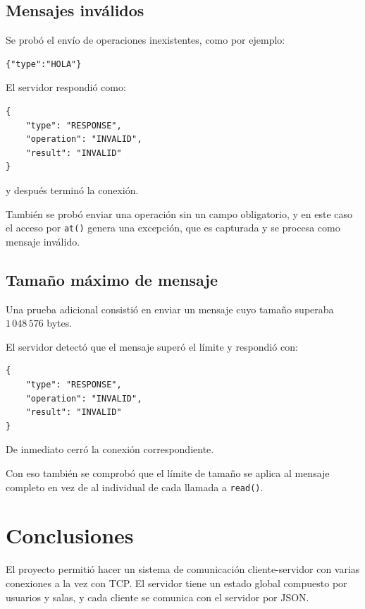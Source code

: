 \documentclass[12pt,letterpaper]{article}
\begin{document}
\subsection{Mensajes inválidos}

Se probó el envío de operaciones inexistentes, como por ejemplo:

\begin{lstlisting}[style=jsonstyle]
{"type":"HOLA"}
\end{lstlisting}

El servidor respondió como:

\begin{lstlisting}[style=jsonstyle]
{
    "type": "RESPONSE",
    "operation": "INVALID",
    "result": "INVALID"
}
\end{lstlisting}

y después terminó la conexión.

También se probó enviar una operación sin un campo obligatorio, y en este caso el acceso por \texttt{at()} genera una excepción, que es capturada y se procesa como mensaje inválido.

\subsection{Tamaño máximo de mensaje}

Una prueba adicional consistió en enviar un mensaje cuyo tamaño superaba
$1\,048\,576$ bytes.

El servidor detectó que el mensaje superó el límite y respondió con:

\begin{lstlisting}[style=jsonstyle]
{
    "type": "RESPONSE",
    "operation": "INVALID",
    "result": "INVALID"
}
\end{lstlisting}

De inmediato cerró la conexión correspondiente.

Con eso también se comprobó que el límite de tamaño se aplica al mensaje completo en vez de al individual de cada llamada a \texttt{read()}.

\section{Conclusiones}

El proyecto permitió hacer un sistema de comunicación cliente-servidor
con varias conexiones a la vez con TCP. El servidor tiene un estado global compuesto por usuarios y salas, y cada cliente
se comunica con el servidor por JSON.
\end{document}
